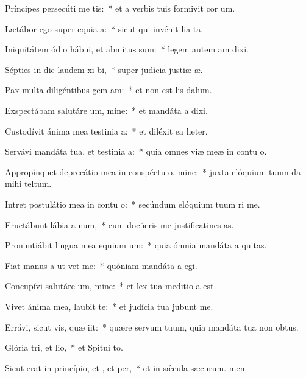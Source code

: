 \item Príncipes persecúti  me tis:~* et a verbis tuis formivit cor um.
\item Lætábor ego super equia a:~* sicut qui invénit lia ta.
\item Iniquitátem ódio hábui, et abmitus sum:~* legem autem am dixi.
\item Sépties in die laudem xi bi,~* super judícia justiæ æ.
\item Pax multa diligéntibus gem am:~* et non est lis dalum.
\item Exspectábam salutáre um, mine:~* et mandáta a dixi.
\item Custodívit ánima mea testinia a:~* et diléxit ea heter.
\item Servávi mandáta tua, et testinia a:~* quia omnes viæ meæ in contu o.
\item Appropínquet deprecátio mea in conspéctu o, mine:~* juxta elóquium tuum da mihi teltum.
\item Intret postulátio mea in contu o:~* secúndum elóquium tuum ri me.
\item Eructábunt lábia a num,~* cum docúeris me justificatines as.
\item Pronuntiábit lingua mea equium um:~* quia ómnia mandáta a quitas.
\item Fiat manus a ut vet me:~* quóniam mandáta a egi.
\item Concupívi salutáre um, mine:~* et lex tua meditio a est.
\item Vivet ánima mea,  laubit te:~* et judícia tua jubunt me.
\item Errávi, sicut vis, quæ iit:~* quære servum tuum, quia mandáta tua non  obtus.
\item Glória tri, et lio,~* et Spitui to.
\item Sicut erat in princípio, et , et per,~* et in sǽcula sæcurum. men.
